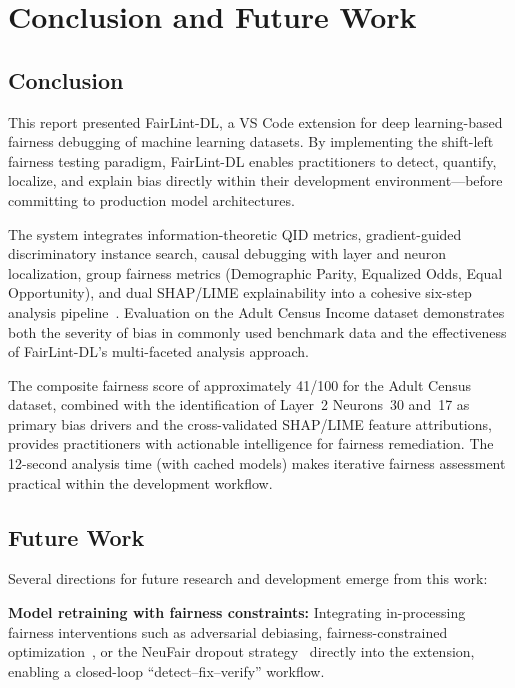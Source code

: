 \chapter{Conclusion and Future Work}
\label{ch:conclusion}

\section{Conclusion}

This report presented FairLint-DL, a VS Code extension for deep learning-based fairness debugging of machine learning datasets. By implementing the shift-left fairness testing paradigm, FairLint-DL enables practitioners to detect, quantify, localize, and explain bias directly within their development environment---before committing to production model architectures.

The system integrates information-theoretic QID metrics, gradient-guided discriminatory instance search, causal debugging with layer and neuron localization, group fairness metrics (Demographic Parity, Equalized Odds, Equal Opportunity), and dual SHAP/LIME explainability into a cohesive six-step analysis pipeline~\cite{dice, neufair}. Evaluation on the Adult Census Income dataset demonstrates both the severity of bias in commonly used benchmark data and the effectiveness of FairLint-DL's multi-faceted analysis approach.

The composite fairness score of approximately 41/100 for the Adult Census dataset, combined with the identification of Layer~2 Neurons~30 and~17 as primary bias drivers and the cross-validated SHAP/LIME feature attributions, provides practitioners with actionable intelligence for fairness remediation. The 12-second analysis time (with cached models) makes iterative fairness assessment practical within the development workflow.

\section{Future Work}

Several directions for future research and development emerge from this work:

\textbf{Model retraining with fairness constraints:} Integrating in-processing fairness interventions such as adversarial debiasing, fairness-constrained optimization~\cite{agarwal2018}, or the NeuFair dropout strategy~\cite{neufair} directly into the extension, enabling a closed-loop ``detect--fix--verify'' workflow.

